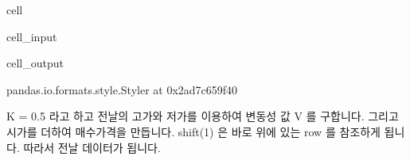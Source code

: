 \documentclass[letterpaper,10pt,english]{jupyterBook}
\begin{document}
\begin{sphinxuseclass}{cell}\begin{sphinxVerbatimInput}

\begin{sphinxuseclass}{cell_input}
\begin{sphinxVerbatim}[commandchars=\\\{\}]
    

   
     
\end{sphinxVerbatim}

\end{sphinxuseclass}\end{sphinxVerbatimInput}
\begin{sphinxVerbatimOutput}

\begin{sphinxuseclass}{cell_output}
\begin{sphinxVerbatim}[commandchars=\\\{\}]
\PYGZlt{}pandas.io.formats.style.Styler at 0x2ad7c659f40\PYGZgt{}
\end{sphinxVerbatim}

\end{sphinxuseclass}\end{sphinxVerbatimOutput}

\end{sphinxuseclass}
\sphinxAtStartPar
 K = 0.5 라고 하고 전날의 고가와 저가를 이용하여 변동성 값 V 를 구합니다. 그리고 시가를 더하여 매수가격을 만듭니다. shift(1) 은 바로 위에 있는 row 를 참조하게 됩니다. 따라서 전날 데이터가 됩니다.
\end{document}
